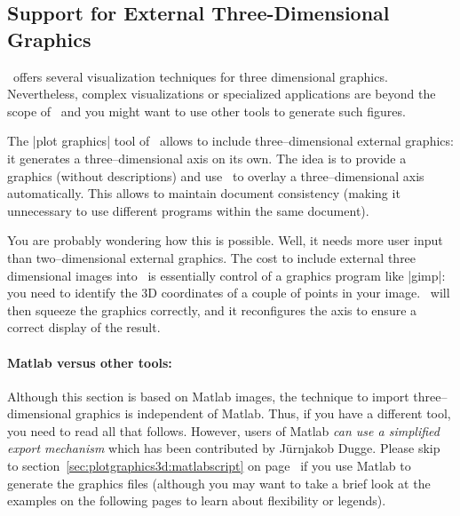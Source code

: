 {{
	
\subsection*{Support for External Three-Dimensional Graphics}
\label{sec:plotgraphics3d}
\PGFPlots\ offers several visualization techniques for three dimensional graphics. Nevertheless, complex visualizations or specialized applications are beyond the scope of \PGFPlots\ and you might want to use other tools to generate such figures. 

The |plot graphics| tool of \PGFPlots\ allows to include three--dimensional external graphics: it generates a three--dimensional axis on its own. The idea is to provide a graphics (without descriptions) and use \PGFPlots\ to overlay a three--dimensional axis automatically. This allows to maintain document consistency (making it unnecessary to use different programs within the same document). 

You are probably wondering how this is possible. Well, it needs more user input than two--dimensional external graphics. The cost to include external three dimensional images into \PGFPlots\ is essentially control of a graphics program like |gimp|: you need to identify the 3D coordinates of a couple of points in your image. \PGFPlots\ will then squeeze the graphics correctly, and it reconfigures the axis to ensure a correct display of the result.

\paragraph{Matlab versus other tools:} Although this section is based on Matlab images, the technique to import three--dimensional graphics is independent of Matlab. Thus, if you have a different tool, you need to read all that follows. However, users of Matlab \emph{can use a simplified export mechanism} which has been contributed by J\"urnjakob Dugge. Please skip to section~\ref{sec:plotgraphics3d:matlabscript} on page~\pageref{sec:plotgraphics3d:matlabscript} if you use Matlab to generate the graphics files (although you may want to take a brief look at the examples on the following pages to learn about flexibility or legends).

}}
